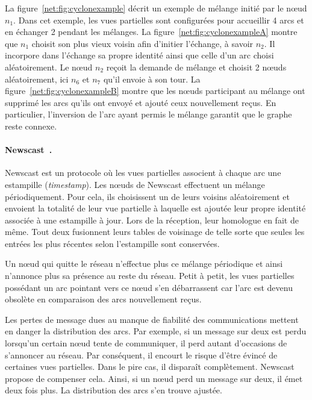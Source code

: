 \noindent La figure~\ref{net:fig:cyclonexample} décrit un exemple de mélange
initié par le nœud $n_1$. Dans cet exemple, les vues partielles sont configurées
pour accueillir 4 arcs et en échanger 2 pendant les mélanges. La
figure~\ref{net:fig:cyclonexampleA} montre que $n_1$ choisit son plus vieux
voisin afin d'initier l'échange, à savoir $n_2$. Il incorpore dans l'échange sa
propre identité ainsi que celle d'un arc choisi aléatoirement. Le nœud $n_2$
reçoit la demande de mélange et choisit 2 nœuds aléatoirement, ici $n_6$ et
$n_7$ qu'il envoie à son tour. La figure~\ref{net:fig:cyclonexampleB} montre que
les nœuds participant au mélange ont supprimé les arcs qu'ils ont envoyé et
ajouté ceux nouvellement reçus. En particulier, l'inversion de l'arc ayant permis
le mélange garantit que le graphe reste connexe.

\paragraph{Newscast~\cite{tolgyeski2009adaptive}.} Newscast est un protocole où
les vues partielles associent à chaque arc une estampille
(\emph{timestamp}). Les nœuds de Newscast effectuent un mélange
périodiquement. Pour cela, ils choisissent un de leurs voisins aléatoirement et
envoient la totalité de leur vue partielle à laquelle est ajoutée leur propre
identité associée à une estampille à jour. Lors de la réception, leur homologue
en fait de même. Tout deux fusionnent leurs tables de voisinage de telle sorte
que seules les entrées les plus récentes selon l'estampille sont conservées.

\noindent Un nœud qui quitte le réseau n'effectue plus ce mélange périodique et
ainsi n'annonce plus sa présence au reste du réseau. Petit à petit, les vues
partielles possédant un arc pointant vers ce nœud s'en débarrassent car l'arc
est devenu obsolète en comparaison des arcs nouvellement reçus.

\noindent Les pertes de message dues au manque de fiabilité des communications
mettent en danger la distribution des arcs. Par exemple, si un message sur deux
est perdu lorsqu'un certain nœud tente de communiquer, il perd autant
d'occasions de s'annoncer au réseau. Par conséquent, il encourt le risque d'être
évincé de certaines vues partielles. Dans le pire cas, il disparaît
complètement. Newscast propose de compenser cela. Ainsi, si un nœud perd un
message sur deux, il émet deux fois plus. La distribution des arcs s'en trouve
ajustée.

